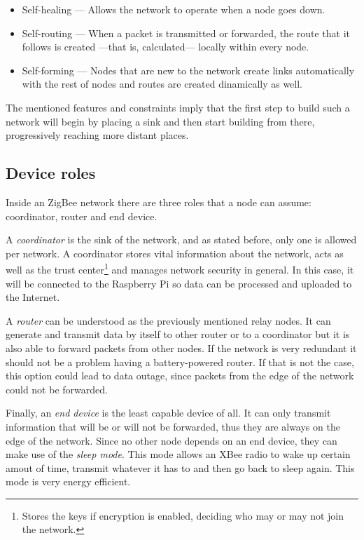 \begin{itemize}
    \item Self-healing --- Allows the network to operate when a node goes down.
    \item Self-routing --- When a packet is transmitted or forwarded, the route that it follows is created ---that is, calculated--- locally within every node.
    \item Self-forming --- Nodes that are new to the network create links automatically with the rest of nodes and routes are created dinamically as well.
\end{itemize}

The mentioned features and constraints imply that the first step to build such a network will begin by placing a sink and then start building from there, progressively reaching more distant places.

\subsection{Device roles}

Inside an ZigBee network there are three roles that a node can assume: coordinator, router and end device.

A \emph{coordinator} is the sink of the network, and as stated before, only one is allowed per network. A coordinator stores vital information about the network, acts as well as the trust center\footnote{Stores the keys if encryption is enabled, deciding who may or may not join the network.} and manages network security in general\cite{sensornetworktc}. In this case, it will be connected to the Raspberry Pi so data can be processed and uploaded to the Internet.

A \emph{router} can be understood as the previously mentioned relay nodes. It can generate and transmit data by itself to other router or to a coordinator but it is also able to forward packets from other nodes. If the network is very redundant it should not be a problem having a battery-powered router. If that is not the case, this option could lead to data outage, since packets from the edge of the network could not be forwarded.

Finally, an \emph{end device} is the least capable device of all. It can only transmit information that will be or will not be forwarded, thus they are always on the edge of the network. Since no other node depends on an end device, they can make use of the \emph{sleep mode}. This mode allows an XBee radio to wake up certain amout of time, transmit whatever it has to and then go back to sleep again. This mode is very energy efficient.

